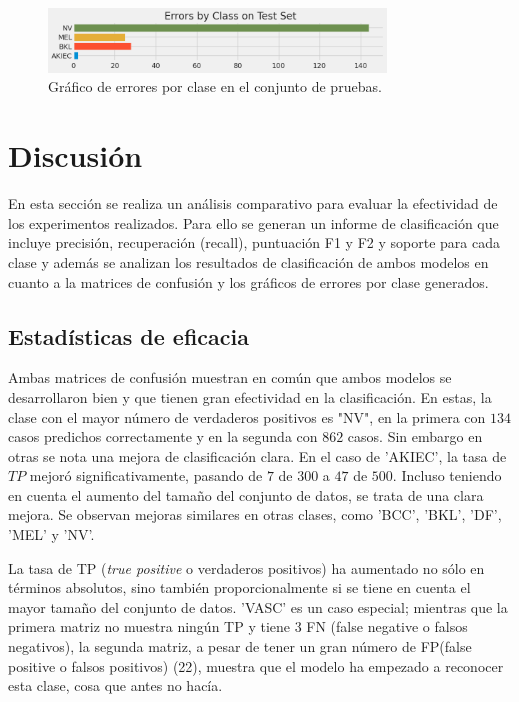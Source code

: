 \begin{figure}[H]
   \begin{center}
       \includegraphics[width=0.8\textwidth]{./Graphics/errorByClass_p3.png}
           \caption{Gráfico de errores por clase en el conjunto de pruebas.\label{fig:class_errors_p3}}
   \end{center}
\end{figure}
        
       
\section{Discusión}

En esta sección se realiza un análisis comparativo para evaluar la efectividad de los experimentos realizados. Para ello se generan un informe de clasificación que incluye precisión, recuperación (recall), puntuación F1 y F2 y soporte para cada clase y además se analizan los resultados de clasificación de ambos modelos en cuanto a la matrices de confusión y los gráficos de errores por clase generados.

\subsection*{Estadísticas de eficacia}\label{sub:accuracy_statistic_p1}

Ambas matrices de confusión muestran en común que ambos modelos se desarrollaron bien y que tienen gran efectividad en la clasificación. En estas, la clase con el mayor número de verdaderos positivos es "NV", en la primera con $134$ casos predichos correctamente y en la segunda con $862$ casos. Sin embargo en otras se nota una mejora de clasificación clara. En el caso de 'AKIEC', la tasa de $TP$ mejoró significativamente, pasando de $7$ de $300$ a $47$ de $500$. Incluso teniendo en cuenta el aumento del tamaño del conjunto de datos, se trata de una clara mejora. Se observan mejoras similares en otras clases, como 'BCC', 'BKL', 'DF', 'MEL' y 'NV'. 

La tasa de TP (\textit{true positive} o verdaderos positivos) ha aumentado no sólo en términos absolutos, sino también proporcionalmente si se tiene en cuenta el mayor tamaño del conjunto de datos. 'VASC' es un caso especial; mientras que la primera matriz no muestra ningún TP y tiene 3 FN (false negative o falsos negativos), la segunda matriz, a pesar de tener un gran número de FP(false positive o falsos positivos) (22), muestra que el modelo ha empezado a reconocer esta clase, cosa que antes no hacía.

